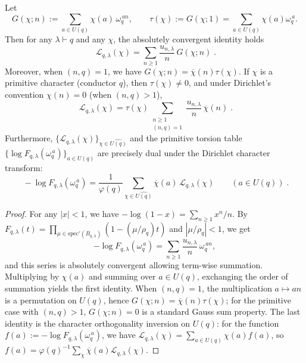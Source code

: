 \begin{theorem}\label{thm:pom-schur-dirichlet-factorization}
Let
\[
G(\chi;n):=\sum_{a\in U(q)}\chi(a)\,\omega_q^{\,an},
\qquad
\tau(\chi):=G(\chi;1)=\sum_{a\in U(q)}\chi(a)\omega_q^{\,a}.
\]
Then for any \(\lambda\vdash q\) and any \(\chi\), the absolutely convergent identity holds
\[
\boxed{\;
\mathcal{L}_{q,\lambda}(\chi)
=
\sum_{n\ge1}\frac{u_{n,\lambda}}{n}\,G(\chi;n)\; }.
\]
Moreover, when \((n,q)=1\), we have \(G(\chi;n)=\overline{\chi}(n)\tau(\chi)\).
If \(\chi\) is a primitive character (conductor \(q\)), then \(\tau(\chi)\neq0\), and under Dirichlet's convention \(\chi(n)=0\) (when \((n,q)>1\)),
\[
\boxed{\;
\mathcal{L}_{q,\lambda}(\chi)
=
\tau(\chi)\sum_{\substack{n\ge1\\(n,q)=1}}\frac{u_{n,\lambda}}{n}\,\overline{\chi}(n)\; }.
\]
Furthermore, \(\{\mathcal{L}_{q,\lambda}(\chi)\}_{\chi\in\widehat{U(q)}}\) and the primitive torsion table \(\{\log F_{q,\lambda}(\omega_q^{\,a})\}_{a\in U(q)}\) are precisely dual under the Dirichlet character transform:
\[
\boxed{\;
-\log F_{q,\lambda}(\omega_q^{\,a})
=
\frac{1}{\varphi(q)}\sum_{\chi\in\widehat{U(q)}}\overline{\chi}(a)\,\mathcal{L}_{q,\lambda}(\chi)
\qquad(a\in U(q))\; }.
\]
\end{theorem}
\begin{proof}
For any \(|x|<1\), we have \(-\log(1-x)=\sum_{n\ge1}x^n/n\).
By \(F_{q,\lambda}(t)=\prod_{\mu\in\mathrm{spec}'(B_{q,\lambda})}(1-(\mu/\rho_q)t)\) and \(|\mu/\rho_q|<1\), we get
\[
-\log F_{q,\lambda}(\omega_q^{\,a})
=
\sum_{n\ge1}\frac{u_{n,\lambda}}{n}\,\omega_q^{\,an},
\]
and this series is absolutely convergent allowing term-wise summation.
Multiplying by \(\chi(a)\) and summing over \(a\in U(q)\), exchanging the order of summation yields the first identity.
When \((n,q)=1\), the multiplication \(a\mapsto an\) is a permutation on \(U(q)\), hence \(G(\chi;n)=\overline{\chi}(n)\tau(\chi)\);
for the primitive case with \((n,q)>1\), \(G(\chi;n)=0\) is a standard Gauss sum property.
The last identity is the character orthogonality inversion on \(U(q)\): for the function
\(
f(a):=-\log F_{q,\lambda}(\omega_q^{\,a})
\),
we have \(\mathcal{L}_{q,\lambda}(\chi)=\sum_{a\in U(q)}\chi(a)f(a)\), so
\(
f(a)=\varphi(q)^{-1}\sum_{\chi}\overline{\chi}(a)\mathcal{L}_{q,\lambda}(\chi)
\).
\end{proof}


